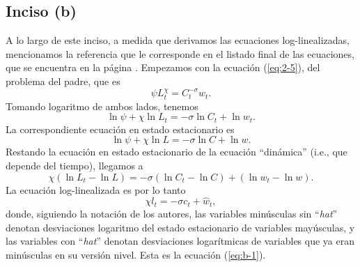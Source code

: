 \documentclass[../../entrega.tex]{subfiles}
\begin{document}
\subsection{Inciso (b)}
A lo largo de este inciso, a medida que derivamos las ecuaciones log-linealizadas, mencionamos la referencia que le corresponde en el listado final de las ecuaciones, que se encuentra en la página \pageref{eq:b-1}.
Empezamos con la ecuación (\ref{eq:2-5}), del problema del padre, que es
\begin{equation*}
    \psi L_t^\chi = C_t^{-\sigma} w_t.
\end{equation*}
Tomando logaritmo de ambos lados, tenemos
\begin{equation*}
    \ln \psi + \chi \ln L_t = -\sigma \ln C_t + \ln w_t.
\end{equation*}
La correspondiente ecuación en estado estacionario es
\begin{equation*}
    \ln \psi + \chi \ln L = -\sigma \ln C + \ln w.
\end{equation*}
Restando la ecuación en estado estacionario de la ecuación ``dinámica'' (i.e., que depende del tiempo), llegamos a
\begin{equation*}
    \chi(\ln L_t - \ln L) = -\sigma(\ln C_t - \ln C) + (\ln w_t - \ln w).
\end{equation*}
La ecuación log-linealizada es por lo tanto
\begin{equation*}
    \chi l_t = -\sigma c_t + \hat{w}_t,
\end{equation*}
donde, siguiendo la notación de los autores, las variables minúsculas sin ``\emph{hat}'' denotan desviaciones logaritmo del estado estacionario de variables mayúsculas, y las variables con ``\emph{hat}'' denotan desviaciones logarítmicas de variables que ya eran minúsculas en su versión nivel.
Esta es la ecuación (\ref{eq:b-1}).
\end{document}
